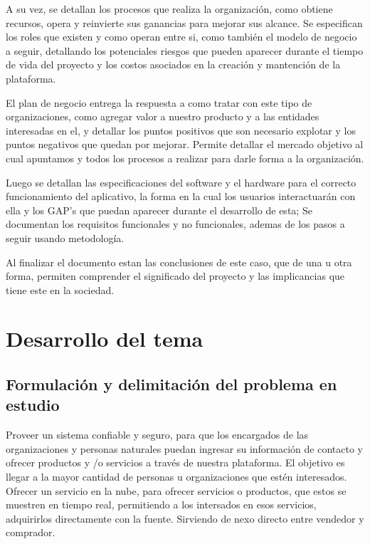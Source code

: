 \documentclass[letterpaper,openright,10pt,oneside]{report}
\begin{document}
	A su vez, se detallan los procesos que realiza la organización, como obtiene recursos, opera y reinvierte sus ganancias para mejorar sus alcance. Se especifican los roles que existen y como operan entre si, como también el modelo de negocio a seguir, detallando los potenciales riesgos que pueden aparecer durante el tiempo de vida del proyecto y los costos asociados en la creación y mantención de la plataforma.
	
	El plan de negocio entrega la respuesta a como tratar con este tipo de organizaciones, como agregar valor a nuestro producto y a las entidades interesadas en el, y detallar los puntos positivos que son necesario explotar y los puntos negativos que quedan por mejorar. Permite detallar el mercado objetivo al cual apuntamos y todos los procesos a realizar para darle forma a la organización.
	
	Luego se detallan las especificaciones del software y el hardware para el correcto funcionamiento del aplicativo, la forma en la cual los usuarios interactuarán con ella y los GAP's que puedan aparecer durante el desarrollo de esta; Se documentan los requisitos funcionales y no funcionales, ademas de los pasos a seguir usando metodología.
	
	Al finalizar el documento estan las conclusiones de este caso, que de una u otra forma, permiten comprender el significado del proyecto y las implicancias que tiene este en la sociedad.


\newpage
\tableofcontents
	
	
\part{Desarrollo del tema}
	\chapter{Formulación y delimitación del problema en estudio}
	Proveer un sistema confiable y seguro, para que los encargados de las organizaciones y personas naturales puedan ingresar su información de contacto y ofrecer productos y /o servicios a través de nuestra plataforma. El objetivo es llegar a la mayor cantidad de personas u organizaciones que estén interesados.
		Ofrecer un servicio en la nube, para ofrecer servicios o productos, que estos se muestren en tiempo real, permitiendo a los intersados en esos servicios, adquirirlos directamente con la fuente. Sirviendo de nexo directo entre vendedor y comprador.
\end{document}
